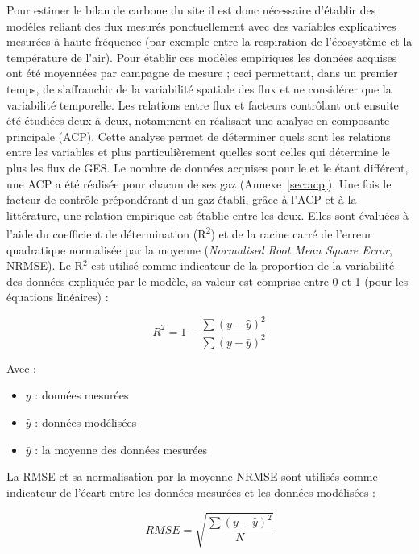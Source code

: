 Pour estimer le bilan de carbone du site il est donc nécessaire d'établir des modèles reliant des flux mesurés ponctuellement avec des variables explicatives mesurées à haute fréquence (par exemple entre la respiration de l'écosystème et la température de l'air).
Pour établir ces modèles empiriques les données acquises ont été moyennées par campagne de mesure ; ceci permettant, dans un premier temps, de s'affranchir de la variabilité spatiale des flux et ne considérer que la variabilité temporelle.
Les relations entre flux et facteurs contrôlant ont ensuite été étudiées deux à deux, notamment en réalisant une analyse en composante principale (ACP).
Cette analyse permet de déterminer quels sont les relations entre les variables et plus particulièrement quelles sont celles qui détermine le plus les flux de GES.
Le nombre de données acquises pour le \coo et le \chh étant différent, une ACP a été réalisée pour chacun de ses gaz (Annexe~\ref{sec:acp}).
Une fois le facteur de contrôle prépondérant d'un gaz établi, grâce à l'ACP et à la littérature, une relation empirique est établie entre les deux.
Elles sont évaluées à l'aide du coefficient de détermination (R\textsuperscript{2}) et de la racine carré de l'erreur quadratique normalisée par la moyenne (\textit{Normalised Root Mean Square Error}, NRMSE).
Le R$^{2}$ est utilisé comme indicateur de la proportion de la variabilité des données expliquée par le modèle, sa valeur est comprise entre 0 et 1 (pour les équations linéaires) : 

$$ R^{2} = 1 - \frac{\sum(y-\hat{y})^2}{\sum(y-\bar{y})^2} $$ 

Avec : 
\begin{itemize}
\item $y$ : données mesurées
\item $\hat{y}$ : données modélisées
\item $\bar{y}$ : la moyenne des données mesurées
\end{itemize}

La RMSE et sa normalisation par la moyenne NRMSE sont utilisés comme indicateur de l'écart entre les données mesurées et les données modélisées :

$$ RMSE = \sqrt{\frac{\sum(y - \hat{y})^2}{N}} $$

